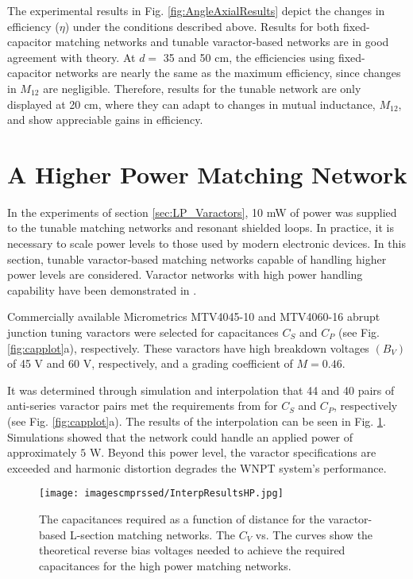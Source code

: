 \documentclass[journal]{IEEEtran}
\begin{document}
The experimental results in Fig. \ref{fig:AngleAxialResults} depict the changes in efficiency ($\eta$) under the conditions described above. Results for both fixed-capacitor matching networks and tunable varactor-based networks are in good agreement with theory. At $d=$ 35 and 50 cm, the efficiencies using fixed-capacitor networks are nearly the same as the maximum efficiency, since changes in $M_{12}$ are negligible. Therefore, results for the tunable network are only displayed at 20 cm, where they can adapt to changes in mutual inductance, $M_{12}$, and show appreciable gains in efficiency.

\section{A Higher Power Matching Network}

In the experiments of section \ref{sec:LP_Varactors}, 10 mW of power was supplied to the tunable matching networks and resonant shielded loops. In practice, it is necessary to scale power levels to those used by modern electronic devices. In this section, tunable varactor-based matching networks capable of handling higher power levels are considered. Varactor networks with high power handling capability have been demonstrated in \cite{VaracAmps,Buis1}.

Commercially available Micrometrics MTV4045-10 and MTV4060-16 abrupt junction tuning varactors were selected for capacitances $C_S$ and $C_P$ (see Fig. \ref{fig:capplot}a), respectively. These varactors have high breakdown voltages $(B_V)$ of 45 V and 60 V, respectively, and a grading coefficient of $M=0.46$.

It was determined through simulation and interpolation that 44 and 40 pairs of anti-series varactor pairs met the requirements from for $C_S$ and $C_P$, respectively (see Fig. \ref{fig:capplot}a). The results of the interpolation can be seen in Fig. \ref{fig:InterpResultsHP}. Simulations showed that the network could handle an applied power of approximately $5$ W. Beyond this power level, the varactor specifications are exceeded and harmonic distortion degrades the WNPT system's performance.
\begin{figure}[htbp]
    \centering
    \texttt{[image: imagescmprssed/InterpResultsHP.jpg]}
    \caption{The capacitances required as a function of distance for the varactor-based L-section matching networks. The $C_V$ vs. The curves show the theoretical reverse bias voltages needed to achieve the required capacitances for the high power matching networks.}
    \label{fig:InterpResultsHP}
\end{figure}
\end{document}
